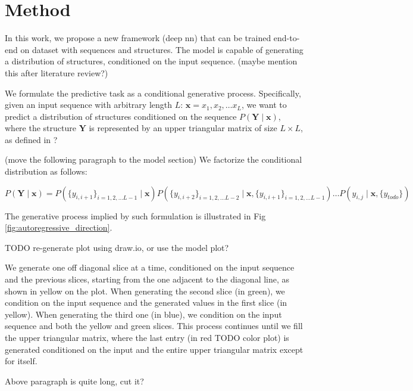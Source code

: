 \documentclass{article}
\begin{document}

\section{Method}


In this work, we propose a new framework (deep nn) that can be trained end-to-end on dataset with sequences and structures.
The model is capable of generating a distribution of structures, conditioned on the input sequence.
(maybe mention this after literature review?)

We formulate the predictive task as a conditional generative process.
Specifically, given an input sequence with arbitrary length $L$: $\bm{x} = x_1, x_2, \dots x_{L}$,
we want to predict a distribution of structures conditioned on the sequence $P(\bm{Y} \mid \bm{x})$,
where the structure $\bm{Y}$ is represented by an upper triangular matrix of size $L \times L$, as defined in ?


(move the following paragraph to the model section)
We factorize the conditional distribution as follows:

$$
P(\bm{Y} \mid \bm{x}) = P(\{y_{i, i+1}\}_{i=1, 2, \dots L-1} \mid \bm{x})
P(\{y_{i, i+2}\}_{i=1, 2, \dots L-2} \mid \bm{x}, \{y_{i, i+1}\}_{i=1, 2, \dots L-1})
\dots
P(y_{i, j} \mid \bm{x}, \{y_{todo}\})
$$

The generative process implied by such formulation is illustrated in Fig \ref{fig:autoregressive_direction}.

TODO re-generate plot using draw.io, or use the model plot?

We generate one off diagonal slice at a time, conditioned on the input sequence and the previous slices,
starting from the one adjacent to the diagonal line, as shown in yellow on the plot.
When generating the second slice (in green), we condition on the input sequence and the generated values in the first slice (in yellow).
When generating the third one (in blue), we condition on the input sequence and both the yellow and green slices.
This process continues until we fill the upper triangular matrix,
where the last entry (in red TODO color plot) is generated conditioned on the input and the entire upper triangular matrix except for itself.

Above paragraph is quite long, cut it?
\end{document}
